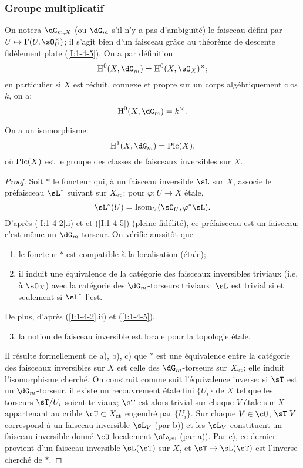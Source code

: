 \subsubsection{Groupe multiplicatif}\label{I:2-2-2}

On notera $\dG_{m,X}$ (ou $\dG_m$ s'il n'y a pas d'ambiguïté) le faisceau 
défini par $U\mapsto \Gamma(U,\sO_U^\times)$; il s'agit bien d'un faisceau 
grâce au théorème de descente fidèlement plate (\ref{I:1-4-5}). On a 
par définition 
\[
  \h^0(X,\dG_m) = \h^0(X,\sO_X)^\times\text{;}
\]
en particulier si $X$ est réduit, connexe et propre sur un corps 
algébriquement clos $k$, on a:
\[
  \h^0(X,\dG_m) = k^\times\text{.}
\]

\begin{proposition}\label{I:2-2-3}
On a un isomorphisme:
\[
  \h^1(X,\dG_m) = \pic(X)\text{,}
\]
où $\operatorname{Pic}(X)$ est le groupe des classes de faisceaux inversibles sur $X$.
\end{proposition}
\begin{proof}
Soit $*$ le foncteur qui, à un faisceau inversible $\sL$ sur $X$, associe le 
préfaisceau $\sL^*$ suivant sur ${X}_{\textnormal{et}}$: pour $\varphi:U\to X$ étale, 
\[
  \sL^*(U)=\operatorname{Isom}_U(\sO_U,\varphi^*\sL)\text{.}
\]
D'après (\ref{I:1-4-2}.i) et et (\ref{I:1-4-5}) (pleine fidélité), ce 
préfaisceau est un faisceau; c'est même un $\dG_m$-torseur. On vérifie 
aussitôt que 
\begin{enumerate}[\indent a)]
  \item le foncteur $*$ est compatible à la localisation (étale);
  \item il induit une équivalence de la catégorie des faisceaux 
    inversibles triviaux (i.e. à $\sO_X$) avec la catégorie des 
    $\dG_m$-torseurs triviaux: $\sL$ est trivial si et seulement si $\sL^*$ 
    l'est.
\end{enumerate}

De plus, d'après (\ref{I:1-4-2}.ii) et (\ref{I:1-4-5}), 
\begin{enumerate}[\indent a)]
\setcounter{enumi}{2}
  \item la notion de faisceau inversible est locale pour la topologie étale. 
\end{enumerate}

Il résulte formellement de a), b), c) que $*$ est une équivalence entre la 
catégorie des faisceaux inversibles sur $X$ est celle des $\dG_m$-torseurs 
sur ${X}_{\textnormal{et}}$; elle induit l'isomorphisme cherché. On construit comme suit 
l'équivalence inverse: si $\sT$ est un $\dG_m$-torseur, il existe un 
recouvrement étale fini $\{U_i\}$ de $X$ tel que les torseurs $\sT/U_i$ soient 
triviaux; $\sT$ est alors trivial sur chaque $V$ étale sur $X$ appartenant au 
crible $\cU\subset \et X$ engendré par $\{U_i\}$. Sur chaque 
$V\in\cU$, $\sT|V$ correspond à un faisceau inversible $\sL_V$ (par b)) et les 
$\sL_V$ constituent un faisceau inversible donné $\cU$-localement $\sL_\cU$ 
(par a)). Par c), ce dernier provient d'un faisceau inversible $\sL(\sT)$ sur 
$X$, et $\sT\mapsto \sL(\sT)$ est l'inverse cherché de $*$. 
\end{proof}
